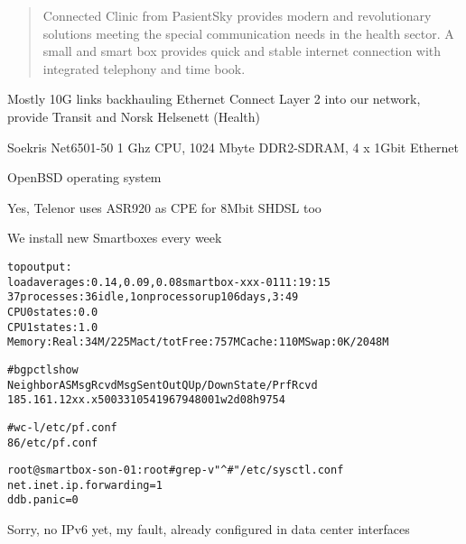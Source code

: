 \documentclass[18pt,landscape,a4paper,footrule]{foils}
\begin{document}
\begin{quote}
Connected Clinic from PasientSky provides modern and revolutionary solutions meeting the special communication needs in the health sector. A small and smart box provides quick and stable internet connection with integrated telephony and time book.
\end{quote}





Mostly 10G links backhauling Ethernet Connect Layer 2 into our network, provide Transit and Norsk Helsenett (Health)




\begin{list2}
\item Soekris Net6501-50 1 Ghz CPU, 1024 Mbyte DDR2-SDRAM, 4 x 1Gbit Ethernet
\item OpenBSD operating system
\item Yes, Telenor uses ASR920 as CPE for 8Mbit SHDSL too\smiley
\item We install new Smartboxes every week
\end{list2}

\begin{alltt}\footnotesize
top output:
load averages:  0.14,  0.09,  0.08                  smartbox-xxx-01 11:19:15
37 processes: 36 idle, 1 on processor                     up 106 days,  3:49
CPU0 states:  0.0% user,  0.0% nice,  0.2% system,  0.0% interrupt, 99.8% idle
CPU1 states:  1.0% user,  0.0% nice,  0.4% system,  0.4% interrupt, 98.2% idle
Memory: Real: 34M/225M act/tot Free: 757M Cache: 110M Swap: 0K/2048M

# bgpctl show
Neighbor              AS    MsgRcvd    MsgSent  OutQ Up/Down  State/PrfRcvd
185.161.12xx.x     50033     105419      67948     0 01w2d08h   9754

# wc -l /etc/pf.conf
      86 /etc/pf.conf

root@smartbox-son-01:root# grep -v "^#" /etc/sysctl.conf
net.inet.ip.forwarding=1
ddb.panic=0
\end{alltt}

Sorry, no IPv6 yet, my fault, already configured in data center interfaces
\end{document}

